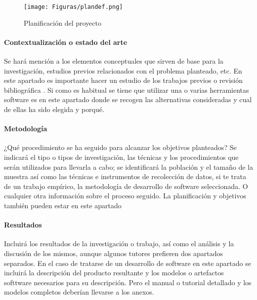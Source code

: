 \begin{figure}  
 	\begin{center}
        \texttt{[image: Figuras/plandef.png]}
        	\end{center}
        \caption{Planificación del proyecto}
    \label{fig:plan}
\end{figure}

\paragraph{Contextualización o estado del arte}

Se hará mención a los elementos conceptuales que  sirven  de  base  para  la  investigación,  estudios  previos  relacionados  con  el problema planteado, etc. En este apartado es importante hacer un estudio de los trabajos previos o revisión bibliográfica \cite{kitchenham2009systematic,kitchenham_2013}. Si como es habitual se tiene  que utilizar una o varias herramientas software es en este apartado donde se recogen las alternativas consideradas y cual de ellas ha sido elegida  y porqué.

\paragraph{Metodología}
¿Qué procedimiento se ha seguido para alcanzar los objetivos
planteados? Se  indicará  el  tipo  o  tipos  de  investigación,  las  técnicas  y  los procedimientos  que  serán  utilizados  para  llevarla  a  cabo;  se  identificará la población  y  el  tamaño  de  la  muestra  así  como  las técnicas  e  instrumentos  de recolección de datos, si te trata de un trabajo empírico, la metodología de desarrollo de software seleccionada. O cualquier otra información sobre el proceso seguido. La planificación y objetivos también pueden estar en este apartado

 
\paragraph{Resultados}
Incluirá  los  resultados  de  la  investigación  o  trabajo,  así como el análisis y la discusión de los mismos, aunque algunos tutores prefieren dos apartados separados. En el caso de tratarse de un desarrollo de software en este apartado se incluirá la descripción del producto resultante y los modelos o artefactos softtware necesarios para su descripción. Pero el manual o tutorial detallado  y los modelos completos deberían llevarse a los anexos.


